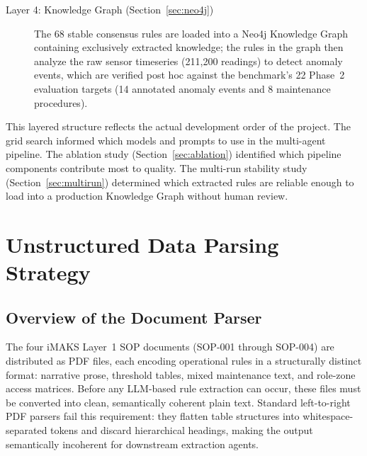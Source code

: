 ﻿\documentclass[11pt]{article}
\begin{document}
\begin{description}
    \item[Layer 4: Knowledge Graph (Section~\ref{sec:neo4j})]
          The 68 stable consensus rules are loaded into a Neo4j Knowledge
          Graph containing exclusively extracted knowledge; the rules in the
          graph then analyze the raw sensor timeseries (211{,}200 readings)
          to detect anomaly events, which are verified post hoc against the
          benchmark's 22 Phase~2 evaluation targets (14 annotated anomaly
          events and 8 maintenance procedures).
\end{description}

This layered structure reflects the actual development order of the project.
The grid search informed which models and prompts to use in the multi-agent
pipeline.
The ablation study (Section~\ref{sec:ablation}) identified which pipeline
components contribute most to quality.
The multi-run stability study (Section~\ref{sec:multirun}) determined which
extracted rules are reliable enough to load into a production Knowledge Graph
without human review.

\section{Unstructured Data Parsing Strategy}
\label{sec:unstructured_parsing}

\subsection{Overview of the Document Parser}
The four iMAKS Layer~1 SOP documents (SOP-001 through SOP-004) are distributed as
PDF files, each encoding operational rules in a structurally distinct format:
narrative prose, threshold tables, mixed maintenance text, and role-zone access
matrices. Before any LLM-based rule extraction can occur, these files must be
converted into clean, semantically coherent plain text. Standard left-to-right
PDF parsers fail this requirement: they flatten table structures into whitespace-
separated tokens and discard hierarchical headings, making the output semantically
incoherent for downstream extraction agents.
\end{document}

